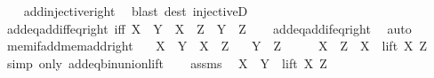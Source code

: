 \begin{isabellebody}
%
\isadelimproof
\ \ %
\endisadelimproof
%
\isatagproof
{}\isamarkupfalse%
\ add{\isacharunderscore}{\kern0pt}injective{\isacharunderscore}{\kern0pt}right\ \isamarkupfalse%
\ {\isacharparenleft}{\kern0pt}blast\ dest{\isacharcolon}{\kern0pt}\ injectiveD{\isacharparenright}{\kern0pt}%
\endisatagproof
{\isafoldproof}%
%
\isadelimproof
\isanewline
%
\endisadelimproof
\isanewline
{}\isamarkupfalse%
\ add{\isacharunderscore}{\kern0pt}eq{\isacharunderscore}{\kern0pt}add{\isacharunderscore}{\kern0pt}iff{\isacharunderscore}{\kern0pt}eq{\isacharunderscore}{\kern0pt}right\ {\isacharbrackleft}{\kern0pt}iff{\isacharbrackright}{\kern0pt}{\isacharcolon}{\kern0pt}\ {\isachardoublequoteopen}X\ {\isacharplus}{\kern0pt}\ Y\ {\isacharequal}{\kern0pt}\ X\ {\isacharplus}{\kern0pt}\ Z\ {\isasymlongleftrightarrow}\ Y\ {\isacharequal}{\kern0pt}\ Z{\isachardoublequoteclose}\isanewline
%
\isadelimproof
\ \ %
\endisadelimproof
%
\isatagproof
{}\isamarkupfalse%
\ add{\isacharunderscore}{\kern0pt}eq{\isacharunderscore}{\kern0pt}add{\isacharunderscore}{\kern0pt}if{\isacharunderscore}{\kern0pt}eq{\isacharunderscore}{\kern0pt}right\ \isamarkupfalse%
\ auto%
\endisatagproof
{\isafoldproof}%
%
\isadelimproof
\isanewline
%
\endisadelimproof
\isanewline
{}\isamarkupfalse%
\ mem{\isacharunderscore}{\kern0pt}if{\isacharunderscore}{\kern0pt}add{\isacharunderscore}{\kern0pt}mem{\isacharunderscore}{\kern0pt}add{\isacharunderscore}{\kern0pt}right{\isacharcolon}{\kern0pt}\isanewline
\ \ \ {\isachardoublequoteopen}X\ {\isacharplus}{\kern0pt}\ Y\ {\isasymin}\ X\ {\isacharplus}{\kern0pt}\ Z{\isachardoublequoteclose}\isanewline
\ \ \ {\isachardoublequoteopen}Y\ {\isasymin}\ Z{\isachardoublequoteclose}\isanewline
%
\isadelimproof
%
\endisadelimproof
%
\isatagproof
{}\isamarkupfalse%
\ {\isacharminus}{\kern0pt}\isanewline
\ \ \isamarkupfalse%
\ {\isachardoublequoteopen}X\ {\isacharplus}{\kern0pt}\ Z\ {\isacharequal}{\kern0pt}\ X\ {\isasymunion}\ lift\ X\ Z{\isachardoublequoteclose}\ \isamarkupfalse%
\ {\isacharparenleft}{\kern0pt}simp\ only{\isacharcolon}{\kern0pt}\ add{\isacharunderscore}{\kern0pt}eq{\isacharunderscore}{\kern0pt}bin{\isacharunderscore}{\kern0pt}union{\isacharunderscore}{\kern0pt}lift{\isacharparenright}{\kern0pt}\isanewline
\ \ \isamarkupfalse%
\ assms\ \isamarkupfalse%
\ {\isachardoublequoteopen}X\ {\isacharplus}{\kern0pt}\ Y\ {\isasymin}\ lift\ X\ Z{\isachardoublequoteclose}\ \isamarkupfalse%

\end{isabellebody}
